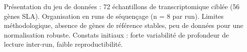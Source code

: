     Présentation du jeu de données : 72 échantillons de transcriptomique ciblée (56 gènes SLA).
    Organisation en runs de séquençage (n = 8 par run).
    Limites méthodologique,  absence de gènes de référence stables, peu de données pour une normalisation robuste.
    Constats initiaux : forte variabilité de profondeur de lecture inter-run, faible reproductibilité.

